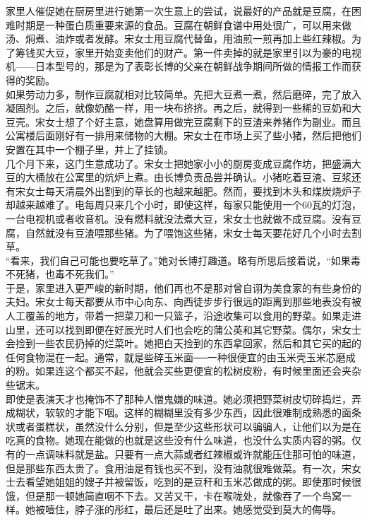家里人催促她在厨房里进行她第一次生意上的尝试，说最好的产品就是豆腐，在困难时期是一种蛋白质重要来源的食品。豆腐在朝鲜食谱中用处很广，可以用来做汤、焖煮、油炸或者发酵。宋女士用豆腐代替鱼，用油煎一煎再加上些红辣椒。为了筹钱买大豆，家里开始变卖他们的财产。第一件卖掉的就是家里引以为豪的电视机——日本型号的，那是为了表彰长博的父亲在朝鲜战争期间所做的情报工作而获得的奖励。\\

如果劳动力多，制作豆腐就相对比较简单。先把大豆煮一煮，然后磨碎，完了放入凝固剂。之后，就像奶酪一样，用一块布挤挤。再之后，就得到一些稀的豆奶和大豆壳。宋女士想了个好主意，她盘算用做完豆腐剩下的豆渣来养猪作为副业。而且公寓楼后面刚好有一排用来储物的大棚。宋女士在市场上买了些小猪，然后把他们安置在其中一个棚子里，并上了挂锁。\\

几个月下来，这门生意成功了。宋女士把她家小小的厨房变成豆腐作坊，把盛满大豆的大桶放在公寓里的炕炉上煮。由长博负责品尝并确认。小猪吃着豆渣、豆浆还有宋女士每天清晨外出割到的草长的也越来越肥。然而，要找到木头和煤炭烧炉子却越来越难了。电每周只来几个小时，即使这样，每家只能使用一个60瓦的灯泡，一台电视机或者收音机。没有燃料就没法煮大豆，宋女士也就做不成豆腐。没有豆腐，自然就没有豆渣喂那些猪。为了喂饱这些猪，宋女士每天要花好几个小时去割草。\\

“看来，我们自己可能也要吃草了。”她对长博打趣道。略有所思后接着说，“如果毒不死猪，也毒不死我们。”\\

于是，家里进入更严峻的新时期，他们再也不是那对曾自诩为美食家的有些身份的夫妇。宋女士每天都要从市中心向东、向西徒步步行很远的距离到那些地表没有被人工覆盖的地方，带着一把菜刀和一只篮子，沿途收集可以食用的野菜。如果走进山里，还可以找到即便在好辰光时人们也会吃的蒲公英和其它野菜。偶尔，宋女士会捡到一些农民扔掉的烂菜叶。她把白天捡到的东西拿回家，然后和其它买的起的任何食物混在一起。通常，就是些碎玉米面──一种很便宜的由玉米壳玉米芯磨成的粉。如果连这个都买不起，他就会买些更便宜的松树皮粉，有时候里面还会夹杂些锯末。\\

即使是表演天才也掩饰不了那种人憎鬼嫌的味道。她必须把野菜树皮切碎捣烂，弄成糊状，软软的才能下咽。这样的糊糊里没有多少东西，因此很难制成熟悉的面条状或者蛋糕状，虽然没什么分别，但是至少这些形状可以骗骗人，让他们以为是在吃真的食物。她现在能做的也就是这些没有什么味道，也没什么实质内容的粥。仅有的一点调味料就是盐。只要有一点大蒜或者红辣椒或许就能压住那可怕的味道，但是那些东西太贵了。食用油是有钱也买不到，没有油就很难做菜。有一次，宋女士去看望她姐姐的嫂子并被留饭，吃到的是豆秆和玉米芯做成的粥。即使那时候很饿，但是那一顿她简直咽不下去。又苦又干，卡在喉咙处，就像吞了一个鸟窝一样。她被噎住，脖子涨的彤红，最后还是吐了出来。她感觉受到莫大的侮辱。\\

